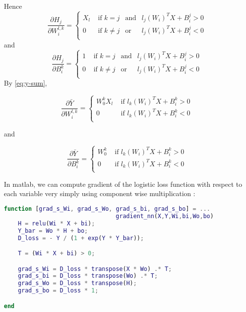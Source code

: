 \documentclass{article}
\newcommand{\pd}[2]{\frac{\partial #1}{\partial #2}}
\begin{document}
Hence
\begin{equation*}
  \pd{H_j}{W_i^{l, k}} = \left\{
    \begin{array}{llcl}
      X_l & \text{ if } k = j &\text{and}& l_j(W_i)^T X + B_i^j > 0 \\
      0 & \text{ if } k \ne j &\text{or}& l_j(W_i)^T X + B_i^j < 0\\
    \end{array}
  \right.
\end{equation*}
and
\begin{equation*}
  \pd{H_j}{B_i^{k}} = \left\{
    \begin{array}{llcl}
      1 & \text{ if } k = j &\text{and}& l_j(W_i)^T X + B_i^j > 0 \\
      0 & \text{ if } k \ne j &\text{or}& l_j(W_i)^T X + B_i^j < 0\\
    \end{array}
  \right.
\end{equation*}
By \ref{eq:y-sum},

\begin{framed}
\begin{equation*}
  \pd{\bar{Y}}{W_i^{l, k}} = \left\{
    \begin{array}{ll}
      W_0^k X_l & \text{ if } l_k(W_i)^T X + B_i^k > 0 \\
      0 & \text{ if } l_k(W_i)^T X + B_i^k < 0\\
    \end{array}
  \right.
\end{equation*}
\end{framed}
and
\begin{framed}
\begin{equation*}
  \pd{\bar{Y}}{B_i^{k}} = \left\{
    \begin{array}{ll}
      W_0^k & \text{ if } l_k(W_i)^T X + B_i^k > 0 \\
      0 & \text{ if } l_k(W_i)^T X + B_i^k < 0\\
    \end{array}
  \right.
\end{equation*}
\end{framed}

In matlab, we can compute gradient of the logistic loss function with
respect to each variable very simply using component wise
multiplication :

\begin{lstlisting}[language=Matlab]
function [grad_s_Wi, grad_s_Wo, grad_s_bi, grad_s_bo] = ...
                                gradient_nn(X,Y,Wi,bi,Wo,bo)
    H = relu(Wi * X + bi);
    Y_bar = Wo * H + bo;
    D_loss = - Y / (1 + exp(Y * Y_bar));

    T = (Wi * X + bi) > 0;

    grad_s_Wi = D_loss * transpose(X * Wo) .* T;
    grad_s_bi = D_loss * transpose(Wo) .* T;
    grad_s_Wo = D_loss * transpose(H);
    grad_s_bo = D_loss * 1;

end
\end{lstlisting}
\end{document}
